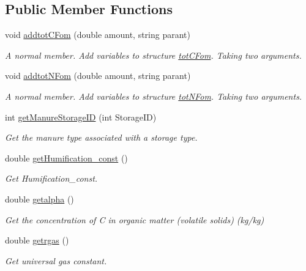\subsection*{Public Member Functions}
\begin{DoxyCompactItemize}
\item 
void \mbox{\hyperlink{class_global_vars_a5659ed6651b76f2d25cc6900309c2a37}{addtot\+C\+Fom}} (double amount, string parant)
\begin{DoxyCompactList}\small\item\em A normal member. Add variables to structure \mbox{\hyperlink{struct_global_vars_1_1tot_c_fom}{tot\+C\+Fom}}. Taking two arguments. \end{DoxyCompactList}\item 
void \mbox{\hyperlink{class_global_vars_a33070ef9c825f07e71cab9822692abf4}{addtot\+N\+Fom}} (double amount, string parant)
\begin{DoxyCompactList}\small\item\em A normal member. Add variables to structure \mbox{\hyperlink{struct_global_vars_1_1tot_n_fom}{tot\+N\+Fom}}. Taking two arguments. \end{DoxyCompactList}\item 
int \mbox{\hyperlink{class_global_vars_ae2f4d6e549b93b918adc8ec6d8f29bf4}{get\+Manure\+Storage\+ID}} (int Storage\+ID)
\begin{DoxyCompactList}\small\item\em Get the manure type associated with a storage type. \end{DoxyCompactList}\item 
double \mbox{\hyperlink{class_global_vars_a3c0002e83c4ffabafc32b95bf139f3d9}{get\+Humification\+\_\+const}} ()
\begin{DoxyCompactList}\small\item\em Get Humification\+\_\+const. \end{DoxyCompactList}\item 
double \mbox{\hyperlink{class_global_vars_a1e20c582fffb03946d2bb113d36cb80c}{getalpha}} ()
\begin{DoxyCompactList}\small\item\em Get the concentration of C in organic matter (volatile solids) (kg/kg) \end{DoxyCompactList}\item 
double \mbox{\hyperlink{class_global_vars_ae9a1a598a830740085352e88a412d302}{getrgas}} ()
\begin{DoxyCompactList}\small\item\em Get universal gas constant. \end{DoxyCompactList}\item 

\end{DoxyCompactItemize}

